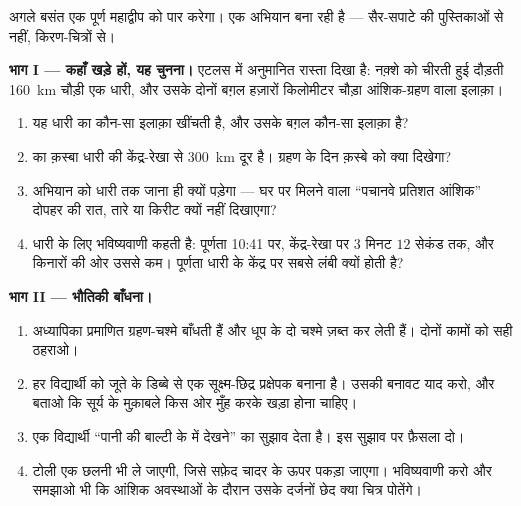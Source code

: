 \begin{problem}\label{pb:g7:shadows-eclipses:1}
अगले बसंत एक पूर्ण  महाद्वीप को पार करेगा।  एक अभियान
बना रही है --- सैर-सपाटे की पुस्तिकाओं से नहीं, किरण-चित्रों से।

\medskip\noindent\textbf{भाग I --- कहाँ खड़े हों, यह चुनना।}
एटलस में अनुमानित रास्ता दिखा है: नक़्शे को चीरती हुई दौड़ती \qty{160}{km}
चौड़ी एक धारी, और उसके दोनों बग़ल हज़ारों किलोमीटर चौड़ा आंशिक-ग्रहण
वाला इलाक़ा।
\begin{enumerate}
  \item यह धारी  का कौन-सा इलाक़ा खींचती है, और उसके बग़ल कौन-सा
        इलाक़ा है?
  \item {} का क़स्बा धारी की केंद्र-रेखा से \qty{300}{km} दूर है।
        ग्रहण के दिन क़स्बे को क्या दिखेगा?
  \item अभियान को धारी तक जाना ही क्यों पड़ेगा --- घर पर मिलने वाला
        ``पचानवे प्रतिशत आंशिक'' दोपहर की रात, तारे या किरीट क्यों
        नहीं दिखाएगा?
  \item धारी के लिए भविष्यवाणी कहती है: पूर्णता 10:41 पर, केंद्र-रेखा
        पर $3$ मिनट $12$ सेकंड तक, और किनारों की ओर उससे कम। पूर्णता
        धारी के केंद्र पर सबसे लंबी क्यों होती है?
\end{enumerate}

\medskip\noindent\textbf{भाग II --- भौतिकी बाँधना।}
\begin{enumerate}[resume]
  \item अध्यापिका प्रमाणित ग्रहण-चश्मे बाँधती हैं और धूप के दो चश्मे
        ज़ब्त कर लेती हैं। दोनों कामों को सही ठहराओ।
  \item हर विद्यार्थी को जूते के डिब्बे से एक सूक्ष्म-छिद्र प्रक्षेपक
        बनाना है। उसकी बनावट याद करो, और बताओ कि सूर्य के मुक़ाबले
        किस ओर मुँह करके खड़ा होना चाहिए।
  \item एक विद्यार्थी ``पानी की बाल्टी के  में देखने'' का
        सुझाव देता है। इस सुझाव पर फ़ैसला दो।
  \item टोली एक छलनी भी ले जाएगी, जिसे सफ़ेद चादर के ऊपर पकड़ा जाएगा।
        भविष्यवाणी करो और समझाओ भी कि आंशिक अवस्थाओं के दौरान उसके
        दर्जनों छेद क्या चित्र पोतेंगे।
\end{enumerate}


\end{problem}
